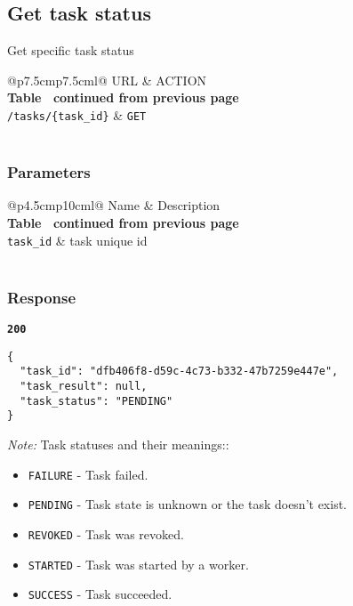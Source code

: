 \subsection{Get task status}
Get specific task status

\begin{longtable}[c]{@{}p{7.5cm}p{7.5cm}l@{}}
  \toprule
  URL                          & ACTION                       \\* \midrule
  \endfirsthead
  \multicolumn{3}{c}%
  {{\bfseries Table \thetable\ continued from previous page}} \\
  \endhead
  \bottomrule
  \endfoot
  \endlastfoot
  \texttt{/tasks/\{task\_id\}} & \texttt{GET}                 \\* \bottomrule
  \label{tab:rdf-fingerprinter-get-task}                          \\
\end{longtable}

\subsubsection{Parameters}
\begin{longtable}[c]{@{}p{4.5cm}p{10cm}l@{}}
  \toprule
  Name              & Description                             \\* \midrule
  \endfirsthead
  \multicolumn{3}{c}%
  {{\bfseries Table \thetable\ continued from previous page}} \\
  \endhead
  \bottomrule
  \endfoot
  \endlastfoot
  \texttt{task\_id} & task unique id                          \\* \bottomrule
  \label{tab:rdf-fingerprinter-get-task-parameters}               \\
\end{longtable}

\subsubsection{Response}
\textbf{\texttt{200}}
\begin{lstlisting}
{
  "task_id": "dfb406f8-d59c-4c73-b332-47b7259e447e",
  "task_result": null,
  "task_status": "PENDING"
}
\end{lstlisting}

\textit{Note:} Task statuses and their meanings::
\begin{itemize}
  \item \texttt{FAILURE} - Task failed.
  \item \texttt{PENDING} - Task state is unknown or the task doesn't exist.
  \item \texttt{REVOKED} - Task was revoked.
  \item \texttt{STARTED} - Task was started by a worker.
  \item \texttt{SUCCESS} - Task succeeded.
\end{itemize}


